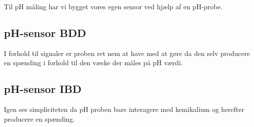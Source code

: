 
Til pH måling har vi bygget vores egen sensor ved hjælp af en pH-probe.

\subsection{pH-sensor BDD}

I forhold til signaler er proben ret nem at have med at gøre da den selv producere en spænding i forhold til den væske der måles på pH værdi.


\subsection{pH-sensor IBD}

Igen ses simpliciteten da pH proben bare interagere med kemikalium og herefter producere en spænding.


